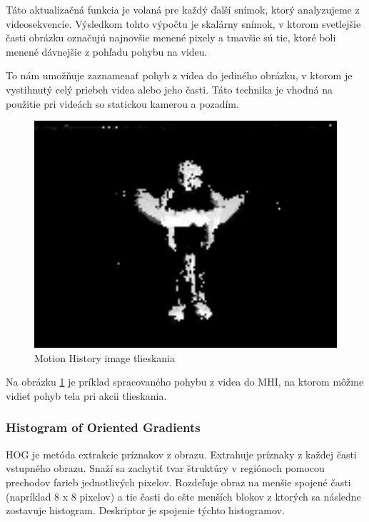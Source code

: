 Táto aktualizačná funkcia je volaná pre každý ďalší snímok, ktorý analyzujeme z videosekvencie. Výsledkom tohto výpočtu je skalárny snímok, v ktorom svetlejšie časti obrázku označujú najnovšie menené pixely a tmavšie sú tie, ktoré boli menené dávnejšie z pohľadu pohybu na videu.

To nám umožňuje zaznamenať pohyb z videa do jediného obrázku, v ktorom je vystihnutý celý priebeh videa alebo jeho časti. Táto technika je vhodná na použitie pri videách so statickou kamerou a pozadím.\cite{c10}

\begin{figure}[H]
  \centering
  \includegraphics[width=13cm]{img/MHIclap.jpg}
  \caption{Motion History image tlieskania}
  \label{MHIclap}
\end{figure}

Na obrázku \ref{MHIclap} je príklad spracovaného pohybu z videa do MHI, na ktorom môžme vidieť pohyb tela pri akcii tlieskania.

	 

\subsubsection{Histogram of Oriented Gradients} \label{HOGlabel}
HOG je metóda extrakcie príznakov z obrazu. Extrahuje príznaky z každej časti vstupného obrazu. Snaží sa zachytiť tvar štruktúry v regiónoch pomocou prechodov farieb jednotlivých pixelov. Rozdeľuje obraz na menšie spojené časti (napríklad 8 x 8 pixelov) a tie časti do ešte menších blokov z ktorých sa následne zostavuje histogram. Deskriptor je spojenie týchto histogramov. 

